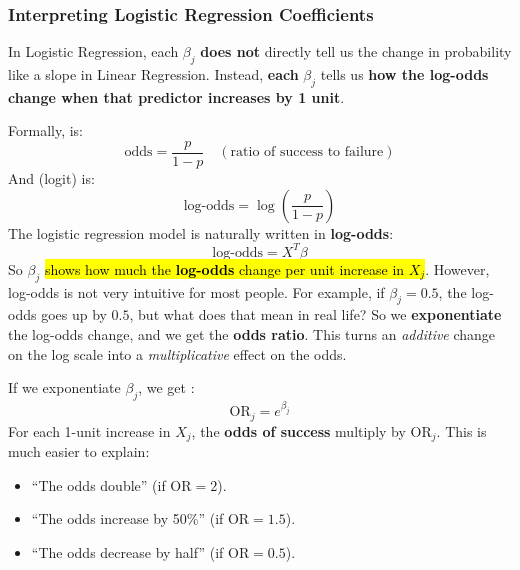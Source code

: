 \subsubsection{Interpreting Logistic Regression Coefficients}

In Logistic Regression, each $\beta_j$ \textbf{does not} directly tell us the change in probability like a slope in Linear Regression. Instead, \textbf{each} $\beta_j$ tells us \textbf{how the log-odds change when that predictor increases by 1 unit}.

\highspace
Formally,  is:
\begin{equation*}
    \text{odds} = \frac{p}{1 - p} \quad (\text{ratio of success to failure})
\end{equation*}
And  (logit) is:
\begin{equation*}
    \text{log-odds} = \log \left( \frac{p}{1 - p} \right)
\end{equation*}
The logistic regression model is naturally written in \textbf{log-odds}:
\begin{equation*}
    \text{log-odds} = X^T \beta
\end{equation*}
So $\beta_j$ \hl{shows how much the \textbf{log-odds} change per unit increase in $X_j$}. However, log-odds is not very intuitive for most people. For example, if $\beta_j = 0.5$, the log-odds goes up by $0.5$, but what does that mean in real life? So we \textbf{exponentiate} the log-odds change, and we get the \textbf{odds ratio}. This turns an \emph{additive} change on the log scale into a \emph{multiplicative} effect on the odds.

\highspace
If we exponentiate $\beta_j$, we get :
\begin{equation}
    \text{OR}_j = e^{\beta_j}
\end{equation}
For each 1-unit increase in $X_j$, the \textbf{odds of success} multiply by $\text{OR}_j$. This is much easier to explain:
\begin{itemize}
    \item ``The odds double'' (if $\text{OR} = 2$).
    \item ``The odds increase by 50\%'' (if $\text{OR} = 1.5$).
    \item ``The odds decrease by half'' (if $\text{OR} = 0.5$).
\end{itemize}
